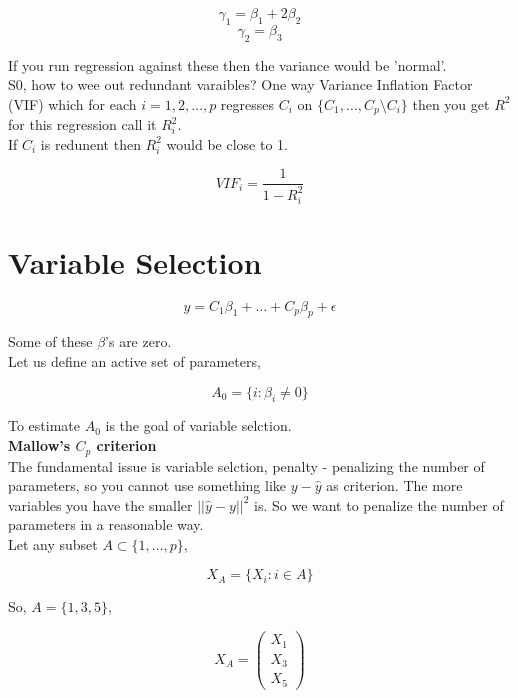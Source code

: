 \documentclass[11pt,fleqn]{book} %
\begin{document}
	$$ \gamma_1 = \beta_1 + 2\beta_2$$
	$$ \gamma_2 = \beta_3$$ 

	If you run regression against these then the variance would be 'normal'.\\

	S0, how to wee out redundant varaibles? One way Variance Inflation Factor (VIF) which for each $ i = 1, 2, \dots, p$ regresses $C_i$ on $\{C_1, \dots, C_p \setminus C_i \}$
then you get $R^2$ for this regression call it $R_i^2$.\\

If $C_i$ is redunent then $R_i^2$ would be close to 1. 

$$VIF_i = \frac{1}{1 - R_i^2} $$










\section{Variable Selection}

$$ y = C_1\beta_1 + \dots + C_p\beta_p + \epsilon$$

Some of these $\beta$'s are zero. \\

Let us define an active set of parameters, 

$$A_0 = \{i: \beta_i \neq 0 \}$$

To estimate $A_0$ is the goal of variable selction. \\

\textbf{Mallow's $C_p$ criterion}\\

The fundamental issue is variable selction, penalty - penalizing the number of parameters, so you cannot use something like $y - \hat{y}$ as criterion. The more variables you have the smaller $||\hat{y} - y ||^2$ is. So we want to penalize the number of parameters in a reasonable way. \\

Let any subset $A \subset \{1, \dots, p\}$, 

$$X_A = \{X_i: i \in A \}$$

So, $A = \{1, 3, 5\}$, 

$$X_A = \begin{pmatrix}
	X_1\\
	X_3\\
	X_5
\end{pmatrix}$$
\end{document}
